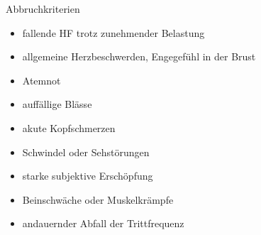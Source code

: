 \documentclass[colorBG,slideColor,9pt]{beamer}
\begin{document}
\begin{frame}{Abbruchkriterien}
\begin{itemize}
	\item fallende HF trotz zunehmender Belastung
	\item allgemeine Herzbeschwerden, Engegefühl in der Brust
	\item Atemnot
	\item auffällige Blässe
	\item akute Kopfschmerzen
	\item Schwindel oder Sehstörungen
	\item starke subjektive Erschöpfung
	\item Beinschwäche oder Muskelkrämpfe
	\item andauernder Abfall der Trittfrequenz
\end{itemize}
\end{frame}
\end{document}
